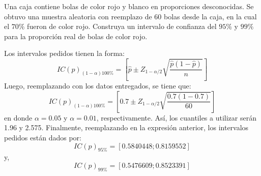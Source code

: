 \addpoints
\question[10] Una caja contiene bolas de color rojo y blanco en proporciones desconocidas. Se obtuvo una muestra aleatoria con reemplazo de 60 bolas desde la caja, en la cual el $70\%$ fueron de color rojo. Construya un intervalo de confianza del $95\%$ y $99\%$ para la proporci\'on real de bolas de color rojo.

\begin{solution}
Los intervalos pedidos tienen la forma:$$IC(p)_{(1-\alpha)100\%}=\left[ \hat{p}\pm Z_{1-\alpha/2}\sqrt{\dfrac{\hat{p}(1-\hat{p})}{n}}\right]$$Luego, reemplazando con los datos entregados, se tiene que:$$IC(p)_{(1-\alpha)100\%}=\left[0.7\pm Z_{1-\alpha/2}\sqrt{\dfrac{0.7(1-0.7)}{60}}\right]$$en donde $\alpha=0.05$ y $\alpha=0.01$, respectivamente. As\'i, los cuantiles a utilizar ser\'an 1.96 y 2.575. Finalmente, reemplazando en la expresi\'on anterior, los intervalos pedidos est\'an dados por:$$IC(p)_{95\%}=\left[0.5840448;0.8159552\right]$$y,$$IC(p)_{99\%}=\left[0.5476609;0.8523391\right]$$
\end{solution}